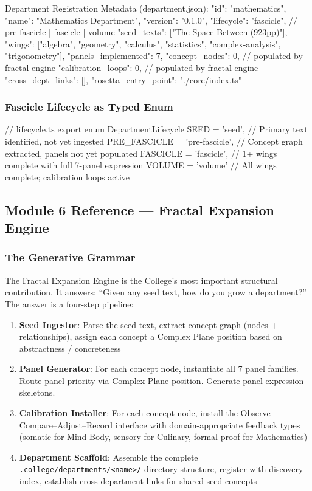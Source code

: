 \documentclass[11pt,letterpaper]{article}
\begin{document}
\begin{asciibox}
Department Registration Metadata (department.json):
{
  "id": "mathematics",
  "name": "Mathematics Department",
  "version": "0.1.0",
  "lifecycle": "fascicle",         // pre-fascicle | fascicle | volume
  "seed_texts": ["The Space Between (923pp)"],
  "wings": ["algebra", "geometry", "calculus", "statistics",
            "complex-analysis", "trigonometry"],
  "panels_implemented": 7,
  "concept_nodes": 0,              // populated by fractal engine
  "calibration_loops": 0,          // populated by fractal engine
  "cross_dept_links": [],
  "rosetta_entry_point": "./core/index.ts"
}
\end{asciibox}

\subsubsection{Fascicle Lifecycle as Typed Enum}

\begin{asciibox}
// lifecycle.ts
export enum DepartmentLifecycle {
  SEED        = 'seed',         // Primary text identified, not yet ingested
  PRE_FASCICLE = 'pre-fascicle', // Concept graph extracted, panels not yet populated
  FASCICLE    = 'fascicle',     // 1+ wings complete with full 7-panel expression
  VOLUME      = 'volume'        // All wings complete; calibration loops active
}
\end{asciibox}

\subsection{Module 6 Reference --- Fractal Expansion Engine}

\subsubsection{The Generative Grammar}

The Fractal Expansion Engine is the College's most important structural contribution. It answers: ``Given any seed text, how do you grow a department?'' The answer is a four-step pipeline:

\begin{enumerate}[leftmargin=1.5em]
  \item \textbf{Seed Ingestor}: Parse the seed text, extract concept graph (nodes + relationships), assign each concept a Complex Plane position based on abstractness / concreteness
  \item \textbf{Panel Generator}: For each concept node, instantiate all 7 panel families. Route panel priority via Complex Plane position. Generate panel expression skeletons.
  \item \textbf{Calibration Installer}: For each concept node, install the Observe--Compare--Adjust--Record interface with domain-appropriate feedback types (somatic for Mind-Body, sensory for Culinary, formal-proof for Mathematics)
  \item \textbf{Department Scaffold}: Assemble the complete \texttt{.college/departments/<name>/} directory structure, register with discovery index, establish cross-department links for shared seed concepts
\end{enumerate}
\end{document}
